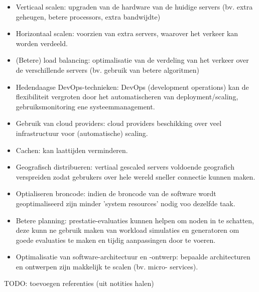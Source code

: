 \begin{itemize}
    \item Verticaal scalen: upgraden van de hardware van de huidige
    servers (bv. extra geheugen, betere processors, extra bandwijdte)
    \item Horizontaal scalen: voorzien van extra servers, waarover het
    verkeer kan worden verdeeld.
    \item (Betere) load balancing: optimalisatie van de verdeling van het
    verkeer over de verschillende servers (bv. gebruik van betere
    algoritmen)
    \item Hedendaagse DevOps-technieken: DevOps (development operations) kan
    de flexibiliteit vergroten door het automatischeren van deployment/scaling,
    gebruiksmonitoring ene systeemmanagement.
    \item Gebruik van cloud providers: cloud providers beschikking over
    veel infrastructuur voor (automatische) scaling.
    \item Cachen: kan laattijden verminderen.
    \item Geografisch distribueren: vertiaal gescaled servers voldoende
    geografich verspreiden zodat gebrukers over hele wereld sneller
    connectie kunnen maken.
    \item Optialiseren broncode: indien de broncode van de software wordt
    geoptimaliseerd zijn minder 'system resources' nodig voo dezelfde
    taak.
    \item Betere planning: prestatie-evaluaties kunnen helpen om noden in
    te schatten, deze kunn ne gebruik maken van workload simulaties en
    generatoren om goede evaluaties te maken en tijdig aanpassingen door
    te voeren.
    \item Optimalisatie van software-architectuur en -ontwerp:
    bepaalde architecturen en ontwerpen zijn makkelijk te scalen (bv. micro-
    services).
\end{itemize}


TODO: toevoegen referenties (uit notities halen)
